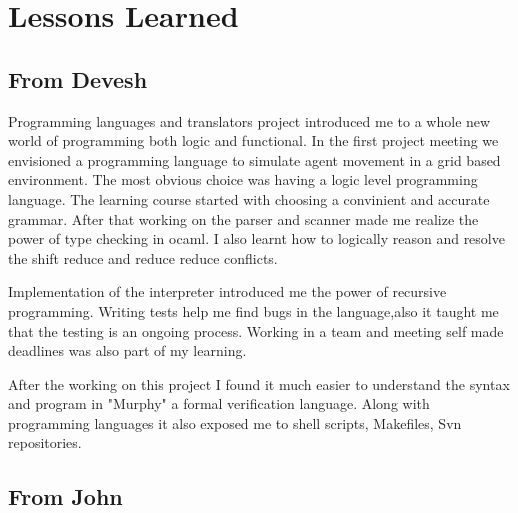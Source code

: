 \documentclass[onecolumn,titlepage]{article}
\begin{document}
\section{Lessons Learned}

\subsection{From Devesh}
Programming languages and translators project introduced me to a whole
new world of programming both logic and functional. In the first
project meeting we envisioned a programming language to simulate agent
movement in a grid based environment. The most obvious choice was
having a logic level programming language. The learning course started
with choosing a convinient and accurate grammar. After that working on
the parser and scanner made me realize the power of type checking in
ocaml. I also learnt how to logically reason and resolve the shift
reduce and reduce reduce conflicts. 

Implementation of the interpreter introduced me the power of recursive
programming. Writing tests help me find bugs in the language,also it
taught me that the testing is an ongoing process. Working in a team
and meeting self made deadlines was also part of my learning. 

After the working on this project I found it much easier to understand
the syntax and program in "Murphy" a formal verification
language. Along with programming languages it also exposed me to shell
scripts, Makefiles, Svn repositories.


\subsection{From John}
\end{document}

